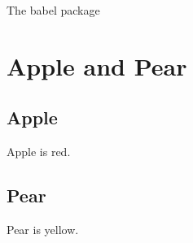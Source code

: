 \documentclass{article}
\begin{document}
The babel package

\tableofcontents %

\section{Apple and Pear}

\subsection{Apple}
Apple is red.

\subsection{Pear}
Pear is yellow.
\end{document}
